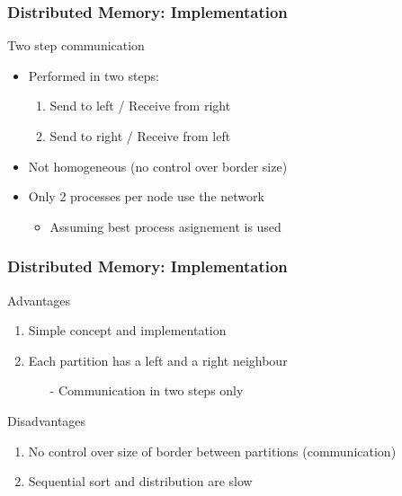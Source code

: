 \begin{frame}
	\frametitle{Distributed Memory: Implementation}

	\begin{block}{Two step communication}
		\begin{itemize}\itemsep=20pt
			\item Performed in two steps:
			\begin{enumerate}\itemsep=10pt
				\item Send to left / Receive from right
				\item Send to right / Receive from left
			\end{enumerate}

			\item Not homogeneous (no control over border size)

			\item Only 2 processes per node use the network
			\begin{itemize}
				\item Assuming best process asignement is used
			\end{itemize}
		\end{itemize}
	\end{block}
\end{frame}

\begin{frame}
\frametitle{Distributed Memory: Implementation}

	\begin{block}{Advantages}
		\begin{enumerate}\itemsep=10pt
			\item Simple concept and implementation
			\item Each partition has a left and a right neighbour
			\begin{itemize}
				\item[-] Communication in two steps only
			\end{itemize}
		\end{enumerate}
	\end{block}

	\begin{block}{Disadvantages}
		\begin{enumerate}\itemsep=10pt
			\item No control over size of border between partitions (communication)
			\item Sequential sort and distribution are slow
		\end{enumerate}
	\end{block}

\end{frame}


